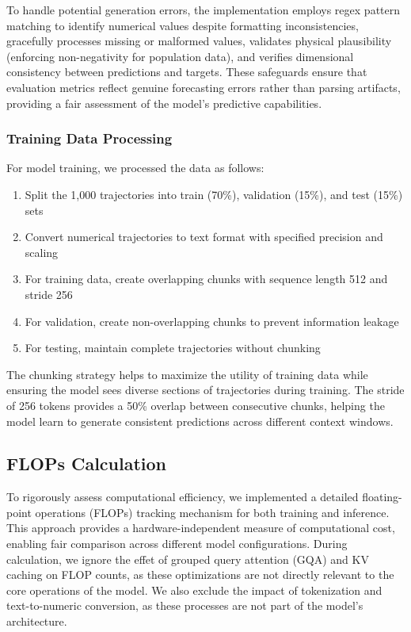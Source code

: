 \documentclass{article}
\begin{document}
To handle potential generation errors, the implementation employs regex pattern matching to identify numerical values despite formatting inconsistencies, gracefully processes missing or malformed values, validates physical plausibility (enforcing non-negativity for population data), and verifies dimensional consistency between predictions and targets. These safeguards ensure that evaluation metrics reflect genuine forecasting errors rather than parsing artifacts, providing a fair assessment of the model's predictive capabilities.
\subsubsection*{Training Data Processing}

For model training, we processed the data as follows:
\begin{enumerate}
    \item Split the 1,000 trajectories into train (70\%), validation (15\%), and test (15\%) sets
    \item Convert numerical trajectories to text format with specified precision and scaling
    \item For training data, create overlapping chunks with sequence length 512 and stride 256
    \item For validation, create non-overlapping chunks to prevent information leakage
    \item For testing, maintain complete trajectories without chunking
\end{enumerate}

The chunking strategy helps to maximize the utility of training data while ensuring the model sees diverse sections of trajectories during training. The stride of 256 tokens provides a 50\% overlap between consecutive chunks, helping the model learn to generate consistent predictions across different context windows.

\subsection*{FLOPs Calculation}

To rigorously assess computational efficiency, we implemented a detailed floating-point operations (FLOPs) tracking mechanism for both training and inference. This approach provides a hardware-independent measure of computational cost, enabling fair comparison across different model configurations. During calculation, we ignore the effet of grouped query attention (GQA) and KV caching on FLOP counts, as these optimizations are not directly relevant to the core operations of the model. We also exclude the impact of tokenization and text-to-numeric conversion, as these processes are not part of the model's architecture.
\end{document}
